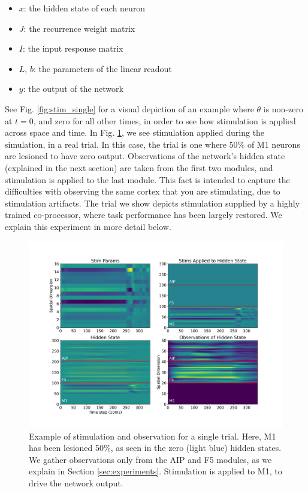 \documentclass[12pt]{iopart}
\begin{document}
\begin{itemize}
	\item $x$: the hidden state of each neuron
	\item $J$: the recurrence weight matrix
	\item $I$: the input response matrix
	\item $L$, $b$: the parameters of the linear readout
	\item $y$: the output of the network
\end{itemize}

See Fig. \ref{fig:stim_single} for a visual depiction of an example where
$\theta$ is non-zero at $t=0$, and zero for all other times, in order to see how
stimulation is applied across space and time. In Fig. \ref{fig:stim_and_obs},
we see stimulation applied during the simulation, in a real trial. In this case,
the trial is one where $50\%$ of M1 neurons are lesioned to have zero output.
Observations of the network's hidden state (explained in the next section) are taken
from the first two modules, and stimulation is applied to the last module. This fact
is intended to capture the difficulties with observing the same cortex that you are
stimulating, due to stimulation artifacts. The trial we show depicts stimulation
supplied by a highly trained co-processor, where task performance has been
largely restored. We explain this experiment in more detail below.

\begin{figure}[h]
	\centering
	\includegraphics[width=\textwidth]{stim_and_obs.png}
	\caption{Example of stimulation and observation for a single trial. Here, M1
	has been lesioned 50\%, as seen in the zero (light blue) hidden states. We
	gather observations only from the AIP and F5 modules, as we explain in
	Section \ref{sec:experiments}. Stimulation is applied to M1, to drive the
	network output.}
	\label{fig:stim_and_obs}
\end{figure}
\end{document}
